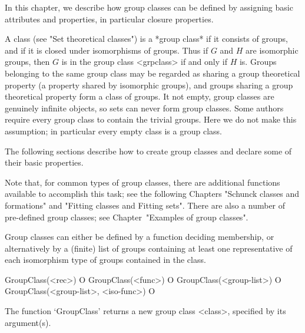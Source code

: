 
In this chapter, we describe how group classes can be defined by assigning
basic attributes and properties, in particular closure properties. 

A class (see "Set theoretical classes") is a *group class* if it consists of
groups, and if it is closed under isomorphisms of groups. Thus if $G$ and
$H$ are isomorphic groups,  then $G$ is in the group class <grpclass> if and
only if
$H$ is. Groups belonging to the same group class may be regarded as sharing
a group theoretical property (a property shared by isomorphic groups), and
groups sharing a group theoretical property form a class of groups. It
not empty, group classes are genuinely infinite objects, so {\GAP} sets can
never form group classes. Some authors require every group class to contain
the trivial groups. Here we do not make this assumption; in particular every
empty class is a group class.


The following sections describe how to create group classes and
declare some of their basic properties. 

Note that,
for common types of group classes, there are additional functions available
to accomplish this task; see the following Chapters 
"Schunck classes and formations" and "Fitting classes and Fitting sets". 
There are also a number of pre-defined group classes; see Chapter~"Examples of
group classes".


\null


Group classes can either be defined by a function deciding membership, or
alternatively by a (finite) list of groups containing at least one
representative of each isomorphism type of groups contained in the class.

\>GroupClass(<rec>) O
\>GroupClass(<func>) O
\>GroupClass(<group-list>) O
\>GroupClass(<group-list>, <iso-func>) O

The function `GroupClass' returns a new group class <class>, specified by its
argument(s).

